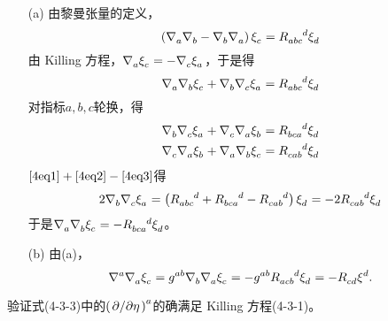 \begin{xiti}
	\begin{zm}
		\begin{enumerate}
			\item[(a)] 由黎曼张量的定义，
			\begin{equation*}
			\left(\Nabla{a}\Nabla{b} - \Nabla{b}\Nabla{a} \right) \tensor{\xi}{_c} = \tensor{R}{_a_b_c^d} \tensor{\xi}{_d}
			\end{equation*}
			由 Killing 方程，$\Nabla{a}\tensor{\xi}{_c} = - \Nabla{c} \tensor{\xi}{_a} $，于是得
			\begin{equation}
			\Nabla{a}\Nabla{b}\tensor{\xi}{_c} + \Nabla{b}\Nabla{c}\tensor{\xi}{_a}= \tensor{R}{_a_b_c^d} \tensor{\xi}{_d}\label{4eq1}
			\end{equation}
			对指标$a,b,c$轮换，得
			\begin{gather}
			\Nabla{b}\Nabla{c}\tensor{\xi}{_a} + \Nabla{c}\Nabla{a}\tensor{\xi}{_b}= \tensor{R}{_b_c_a^d} \tensor{\xi}{_d}\label{4eq2}\\
			\Nabla{c}\Nabla{a}\tensor{\xi}{_b} + \Nabla{a}\Nabla{b}\tensor{\xi}{_c}= \tensor{R}{_c_a_b^d} \tensor{\xi}{_d}\label{4eq3}
			\end{gather}
			$\eqref{4eq1}+\eqref{4eq2}-\eqref{4eq3}$得
			\begin{displaymath}
			2\Nabla{b}\Nabla{c}\tensor{\xi}{_a}=\left( \tensor{R}{_a_b_c^d} + \tensor{R}{_b_c_a^d} - \tensor{R}{_c_a_b^d} \right) \tensor{\xi}{_d}=-2 \tensor{R}{_c_a_b^d} \tensor{\xi}{_d}
			\end{displaymath}
			于是$\Nabla{a}\Nabla{b}\tensor{\xi}{_c} = - \tensor{R}{_b_c_a^d} \tensor{\xi}{_d} $。
			\item[(b)] 由(a)，
			\begin{displaymath}
			\tensor{\nabla}{^a}\Nabla{a} \tensor{\xi}{_c} = \tensor{g}{^a^b} \Nabla{b} \Nabla{a} \tensor{\xi}{_c} = -\tensor{g}{^a^b} \tensor{R}{_a_c_b^d} \tensor{\xi}{_d}=- \tensor{R}{_c_d} \tensor{\xi}{^d}.
			\end{displaymath}
		\end{enumerate}
	\end{zm}
	
	\item 验证式(4-3-3)中的$ \tensor{\left(\pd{\eta}\right)}{^a}$的确满足 Killing 方程(4-3-1)。
	

\end{xiti}
